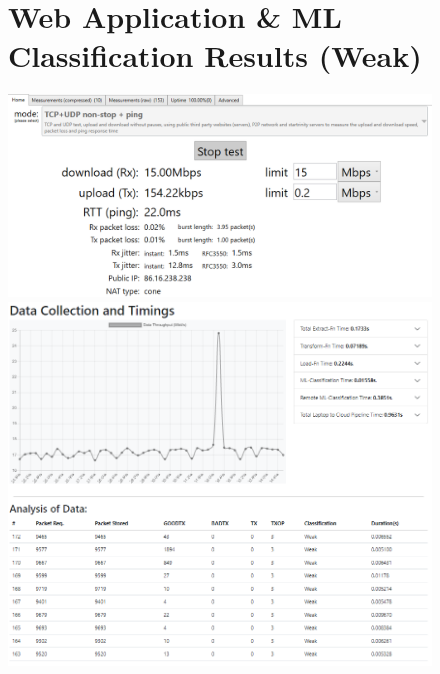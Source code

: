 \begin{figure}
\begin{minipage}{\linewidth}
\section{Web Application \& ML Classification Results (Weak) }
    \centering
    \includegraphics[width=1\linewidth]{images/15mbps.PNG}
    \includegraphics[width=1\linewidth]{images/weak.PNG}
    \label{appendix:WeakData}
\end{minipage}
\end{figure}

